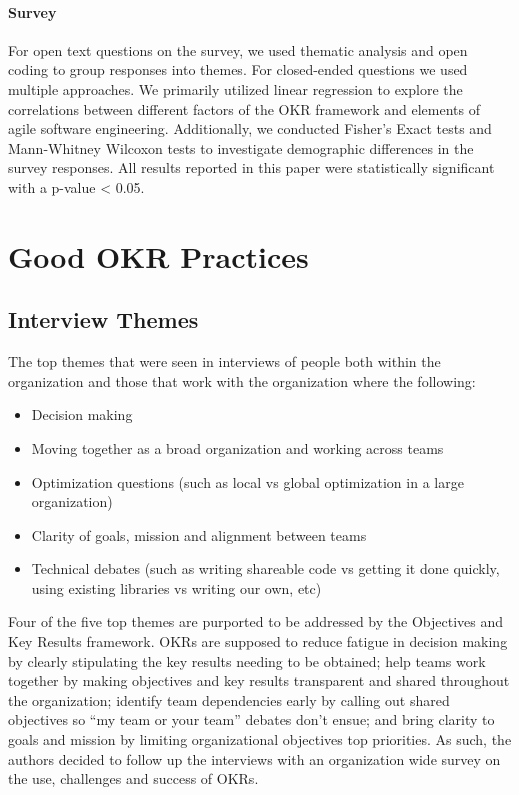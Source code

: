 \documentclass[sigconf, nonacm]{acmart}
\begin{document}
\paragraph{Survey}
For open text questions on the survey, we used thematic analysis and open coding to group responses into themes. For closed-ended questions we used multiple approaches. 
We primarily utilized linear regression to explore the correlations between different factors of the OKR framework and elements of agile software engineering. 
Additionally, we conducted Fisher’s Exact tests and Mann-Whitney Wilcoxon tests to investigate demographic differences in the survey responses.
All results reported in this paper were statistically significant with a p-value < 0.05. 



\section{Good OKR Practices}
\label{sec:goodOKRculture}

\subsection{Interview Themes}
The top themes that were seen in interviews of people both within the organization and those that work with the organization where the following:
\begin{itemize}
    \item Decision making 
    \item Moving together as a broad organization and working across teams
    \item Optimization questions (such as local vs global optimization in a large organization) 
    \item Clarity of goals, mission and alignment between teams
    \item Technical debates (such as writing shareable code vs getting it done quickly, using existing libraries vs writing our own, etc) 
\end{itemize}

Four of the five top themes are purported to be addressed by the Objectives and Key Results framework. OKRs are supposed to reduce fatigue in decision making by clearly stipulating the key results needing to be obtained; help teams work together by making objectives and key results transparent and shared throughout the organization; identify team dependencies early by calling out shared objectives so ``my team or your team'' debates don't ensue; and bring clarity to goals and mission by limiting organizational objectives  top priorities. As such, the authors decided to follow up the interviews with an organization wide survey on the use, challenges and success of OKRs. 
\end{document}
